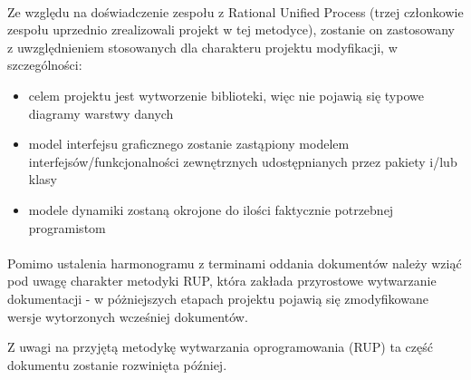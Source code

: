 \documentclass[a4paper,10pt]{article}
\begin{document}
\paragraph{} Ze względu na doświadczenie zespołu z Rational Unified Process (trzej członkowie zespołu uprzednio zrealizowali projekt w tej metodyce), zostanie on zastosowany z uwzględnieniem stosowanych dla charakteru projektu modyfikacji, w szczególności:
\begin{itemize}
 \item celem projektu jest wytworzenie biblioteki, więc nie pojawią się typowe diagramy warstwy danych
\item model interfejsu graficznego zostanie zastąpiony modelem interfejsów/funkcjonalności zewnętrznych udostępnianych przez pakiety i/lub klasy
\item modele dynamiki zostaną okrojone do ilości faktycznie potrzebnej programistom
\end{itemize}
\paragraph{}Pomimo ustalenia harmonogramu z terminami oddania dokumentów należy wziąć pod uwagę charakter metodyki RUP, która zakłada przyrostowe wytwarzanie dokumentacji - w póżniejszych etapach projektu pojawią się zmodyfikowane wersje wytorzonych wcześniej dokumentów.

Z uwagi na przyjętą metodykę wytwarzania oprogramowania (RUP) ta część dokumentu zostanie rozwinięta później.


\clearpage
{}
{}

\end{document}
